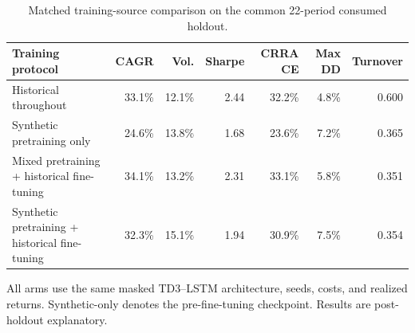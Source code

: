 \begin{table}[t]
\centering
\small
\caption{Matched training-source comparison on the common 22-period consumed holdout.}
\label{tab:mixed-pretraining-comparison}
\begin{tabular}{lrrrrrr}
\toprule
Training protocol & CAGR & Vol. & Sharpe & CRRA CE & Max DD & Turnover \\
\midrule
Historical throughout & 33.1\% & 12.1\% & 2.44 & 32.2\% & 4.8\% & 0.600 \\
Synthetic pretraining only & 24.6\% & 13.8\% & 1.68 & 23.6\% & 7.2\% & 0.365 \\
Mixed pretraining + historical fine-tuning & 34.1\% & 13.2\% & 2.31 & 33.1\% & 5.8\% & 0.351 \\
Synthetic pretraining + historical fine-tuning & 32.3\% & 15.1\% & 1.94 & 30.9\% & 7.5\% & 0.354 \\
\bottomrule
\end{tabular}
\begin{minipage}{0.98\linewidth}\footnotesize
All arms use the same masked TD3--LSTM architecture, seeds, costs, and realized returns. Synthetic-only denotes the pre-fine-tuning checkpoint. Results are post-holdout explanatory.
\end{minipage}
\end{table}
